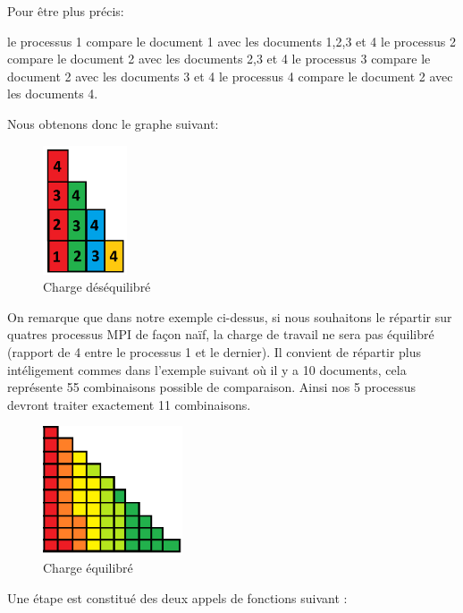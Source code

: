 Pour être plus précis: \newline

le processus 1 compare le document 1 avec les documents 1,2,3 et 4\newline
le processus 2 compare le document 2 avec les documents 2,3 et 4\newline
le processus 3 compare le document 2 avec les documents 3 et 4\newline
le processus 4 compare le document 2 avec les documents 4.

\newpage 
Nous obtenons donc le graphe suivant: 
 
\begin{figure}[h]
\begin{center}
\includegraphics[height=1.5in]{cr/2}
\caption{Charge déséquilibré}
\end{center}
\end{figure}

On remarque que dans notre exemple ci-dessus, si nous souhaitons le répartir sur quatres processus MPI de façon naïf, la charge 
de travail ne sera pas  équilibré (rapport de 4 entre le processus 1 et le dernier). Il convient de répartir plus intéligement commes dans l'exemple suivant où 
il y a 10 documents, cela représente 55 combinaisons possible de comparaison. Ainsi nos 5 processus devront traiter exactement 11 combinaisons.

\begin{figure}[h]
\begin{center}
\includegraphics[height=1.5in]{cr/4}
\caption{Charge équilibré}
\end{center}
\end{figure}


Une étape est constitué des deux appels de fonctions suivant :

